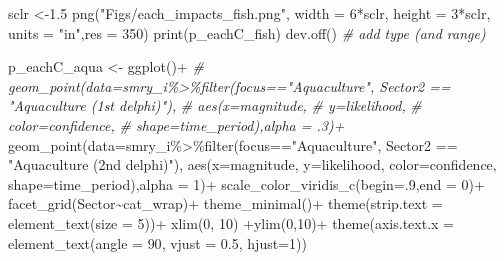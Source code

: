 \documentclass[
]{article}
\newenvironment{Shaded}{\begin{snugshade}}{\end{snugshade}}
\newcommand{\AttributeTok}[1]{\textcolor[rgb]{0.77,0.63,0.00}{#1}}
\newcommand{\CommentTok}[1]{\textcolor[rgb]{0.56,0.35,0.01}{\textit{#1}}}
\newcommand{\DecValTok}[1]{\textcolor[rgb]{0.00,0.00,0.81}{#1}}
\newcommand{\FloatTok}[1]{\textcolor[rgb]{0.00,0.00,0.81}{#1}}
\newcommand{\FunctionTok}[1]{\textcolor[rgb]{0.00,0.00,0.00}{#1}}
\newcommand{\NormalTok}[1]{#1}
\newcommand{\OtherTok}[1]{\textcolor[rgb]{0.56,0.35,0.01}{#1}}
\newcommand{\SpecialCharTok}[1]{\textcolor[rgb]{0.00,0.00,0.00}{#1}}
\newcommand{\StringTok}[1]{\textcolor[rgb]{0.31,0.60,0.02}{#1}}
\begin{document}
\begin{Shaded}
\begin{Highlighting}[]
\NormalTok{    sclr }\OtherTok{\textless{}{-}}\FloatTok{1.5}
\FunctionTok{png}\NormalTok{(}\StringTok{"Figs/each\_impacts\_fish.png"}\NormalTok{, }
    \AttributeTok{width =} \DecValTok{6}\SpecialCharTok{*}\NormalTok{sclr, }\AttributeTok{height =} \DecValTok{3}\SpecialCharTok{*}\NormalTok{sclr, }\AttributeTok{units =} \StringTok{"in"}\NormalTok{,}\AttributeTok{res =} \DecValTok{350}\NormalTok{)}
\FunctionTok{print}\NormalTok{(p\_eachC\_fish)}
\FunctionTok{dev.off}\NormalTok{()}
   \CommentTok{\# add type (and range)}


 
\NormalTok{p\_eachC\_aqua }\OtherTok{\textless{}{-}} \FunctionTok{ggplot}\NormalTok{()}\SpecialCharTok{+}
  \CommentTok{\# geom\_point(data=smry\_i\%\textgreater{}\%filter(focus=="Aquaculture", Sector2 == "Aquaculture (1st delphi)"),}
  \CommentTok{\#                                 aes(x=magnitude,}
  \CommentTok{\#                                     y=likelihood,}
  \CommentTok{\#                                     color=confidence,}
  \CommentTok{\#                                     shape=time\_period),alpha = .3)+}
  \FunctionTok{geom\_point}\NormalTok{(}\AttributeTok{data=}\NormalTok{smry\_i}\SpecialCharTok{\%\textgreater{}\%}\FunctionTok{filter}\NormalTok{(focus}\SpecialCharTok{==}\StringTok{"Aquaculture"}\NormalTok{, Sector2 }\SpecialCharTok{==} \StringTok{"Aquaculture (2nd delphi)"}\NormalTok{),}
                                  \FunctionTok{aes}\NormalTok{(}\AttributeTok{x=}\NormalTok{magnitude,}
                                      \AttributeTok{y=}\NormalTok{likelihood,}
                                      \AttributeTok{color=}\NormalTok{confidence,}
                                      \AttributeTok{shape=}\NormalTok{time\_period),}\AttributeTok{alpha =} \DecValTok{1}\NormalTok{)}\SpecialCharTok{+}
  \FunctionTok{scale\_color\_viridis\_c}\NormalTok{(}\AttributeTok{begin=}\NormalTok{.}\DecValTok{9}\NormalTok{,}\AttributeTok{end =} \DecValTok{0}\NormalTok{)}\SpecialCharTok{+}
  \FunctionTok{facet\_grid}\NormalTok{(Sector}\SpecialCharTok{\textasciitilde{}}\NormalTok{cat\_wrap)}\SpecialCharTok{+}
  \FunctionTok{theme\_minimal}\NormalTok{()}\SpecialCharTok{+} 
  \FunctionTok{theme}\NormalTok{(}\AttributeTok{strip.text =} \FunctionTok{element\_text}\NormalTok{(}\AttributeTok{size =} \DecValTok{5}\NormalTok{))}\SpecialCharTok{+}
  \FunctionTok{xlim}\NormalTok{(}\DecValTok{0}\NormalTok{, }\DecValTok{10}\NormalTok{) }\SpecialCharTok{+}\FunctionTok{ylim}\NormalTok{(}\DecValTok{0}\NormalTok{,}\DecValTok{10}\NormalTok{)}\SpecialCharTok{+} 
  \FunctionTok{theme}\NormalTok{(}\AttributeTok{axis.text.x =} \FunctionTok{element\_text}\NormalTok{(}\AttributeTok{angle =} \DecValTok{90}\NormalTok{, }\AttributeTok{vjust =} \FloatTok{0.5}\NormalTok{, }\AttributeTok{hjust=}\DecValTok{1}\NormalTok{))}


\end{Highlighting}
\end{Shaded}
\end{document}
